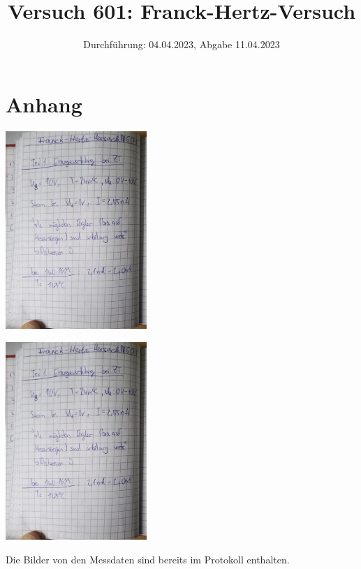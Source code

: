 

\title{Versuch 601: Franck-Hertz-Versuch}
\date{Durchführung: 04.04.2023, Abgabe 11.04.2023}


\maketitle
\thispagestyle{empty} 
\tableofcontents
\newpage
\setcounter{page}{1}






\printbibliography
\newpage

\section*{Anhang}

\begin{minipage}[t]{0.4\textwidth}
    \includegraphics[height=7.5cm, page=1]{Abbildungen/v601_Buch.pdf}
\end{minipage}
\begin{minipage}[t]{0.4\textwidth}
    \includegraphics[height=7.5cm, keepaspectratio, page=2]{Abbildungen/v601_Buch.pdf}
\end{minipage}

\noindent
Die Bilder von den Messdaten sind bereits im Protokoll enthalten.

%

